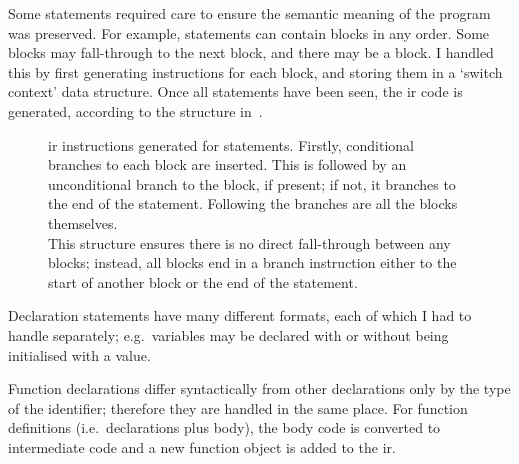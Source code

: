 \documentclass[00-main.tex]{subfiles}
\begin{document}
Some statements required care to ensure the semantic meaning of the program was preserved.
For example,  statements can contain  blocks in any order.
Some blocks may fall-through to the next block, and there may be a  block.
I handled this by first generating instructions for each  block, and storing them in a `switch context' data structure.
Once all  statements have been seen, the \gls{ir} code is generated, according to the structure in~.


\begin{figure}[t]
  \centering
  \caption{%
    \gls{ir} instructions generated for  statements.
    Firstly, conditional branches to each  block are inserted.
    This is followed by an unconditional branch to the  block, if present; if not, it branches to the end of the  statement.
    Following the branches are all the  blocks themselves. \\
    This structure ensures there is no direct fall-through between any  blocks; instead, all blocks end in a branch instruction either to the start of another block or the end of the  statement.
  }
  \label{fig:instr structure for switch statements} %
\end{figure}

Declaration statements have many different formats, each of which I had to handle separately; e.g.~variables may be declared with or without being initialised with a value.

Function declarations differ syntactically from other declarations only by the type of the identifier; therefore they are handled in the same place.
For function definitions (i.e.~declarations plus body), the body code is converted to intermediate code and a new function object is added to the \gls{ir}.
\end{document}
